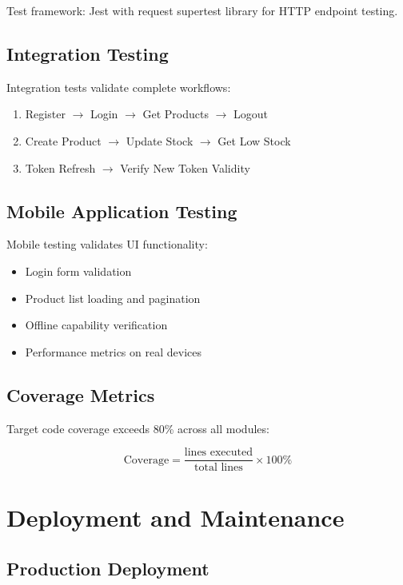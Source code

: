\documentclass[conference]{IEEEtran}
\begin{document}
Test framework: Jest with request supertest library for HTTP endpoint testing.

\subsection{Integration Testing}

Integration tests validate complete workflows:

\begin{enumerate}
\item Register $\rightarrow$ Login $\rightarrow$ Get Products $\rightarrow$ Logout
\item Create Product $\rightarrow$ Update Stock $\rightarrow$ Get Low Stock
\item Token Refresh $\rightarrow$ Verify New Token Validity
\end{enumerate}

\subsection{Mobile Application Testing}

Mobile testing validates UI functionality:

\begin{itemize}
\item Login form validation
\item Product list loading and pagination
\item Offline capability verification
\item Performance metrics on real devices
\end{itemize}

\subsection{Coverage Metrics}

Target code coverage exceeds 80\% across all modules:

\begin{equation}
\text{Coverage} = \frac{\text{lines executed}}{\text{total lines}} \times 100\%
\end{equation}

\section{Deployment and Maintenance}

\subsection{Production Deployment}
\end{document}
